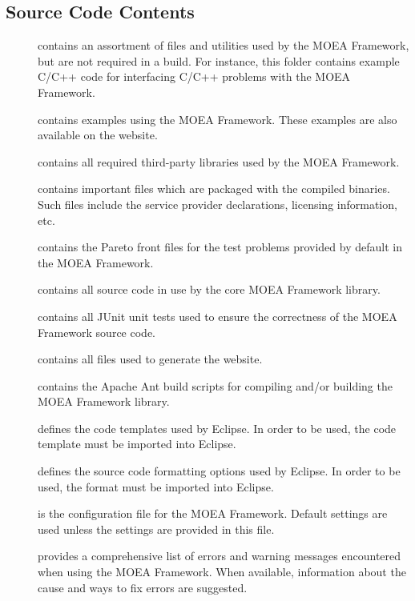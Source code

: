\subsection{Source Code Contents}
\begin{description}
  \item[] contains an assortment of files and utilities used by the MOEA Framework, but are not required in a build.  For instance, this folder contains example C/C++ code for interfacing C/C++ problems with the MOEA Framework.
  \item[] contains examples using the MOEA Framework.  These examples are also available on the website.
  \item[] contains all required third-party libraries used by the MOEA Framework.
  \item[] contains important files which are packaged with the compiled binaries.  Such files include the service provider declarations, licensing information, etc.
  \item[] contains the Pareto front files for the test problems provided by default in the MOEA Framework.
  \item[] contains all source code in use by the core MOEA Framework library.
  \item[] contains all JUnit unit tests used to ensure the correctness of the MOEA Framework source code.
  \item[] contains all files used to generate the website.
  \item[] contains the Apache Ant build scripts for compiling and/or building the MOEA Framework library.
  \item[] defines the code templates used by Eclipse.  In order to be used, the code template must be imported into Eclipse.
  \item[] defines the source code formatting options used by Eclipse.  In order to be used, the format must be imported into Eclipse.
  \item[] is the configuration file for the MOEA Framework.  Default settings are used unless the settings are provided in this file.
  \item[] provides a comprehensive list of errors and warning messages encountered when using the MOEA Framework.  When available, information about the cause and ways to fix errors are suggested.

\end{description}
